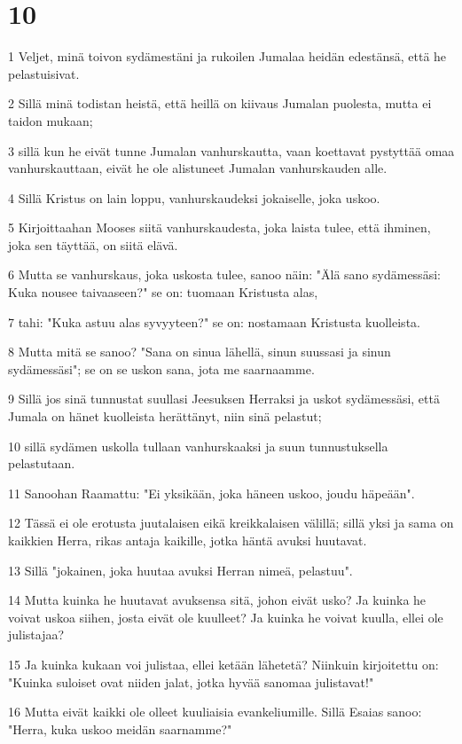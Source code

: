 \chapter{10}

\par 1 Veljet, minä toivon sydämestäni ja rukoilen Jumalaa heidän edestänsä, että he pelastuisivat.
\par 2 Sillä minä todistan heistä, että heillä on kiivaus Jumalan puolesta, mutta ei taidon mukaan;
\par 3 sillä kun he eivät tunne Jumalan vanhurskautta, vaan koettavat pystyttää omaa vanhurskauttaan, eivät he ole alistuneet Jumalan vanhurskauden alle.
\par 4 Sillä Kristus on lain loppu, vanhurskaudeksi jokaiselle, joka uskoo.
\par 5 Kirjoittaahan Mooses siitä vanhurskaudesta, joka laista tulee, että ihminen, joka sen täyttää, on siitä elävä.
\par 6 Mutta se vanhurskaus, joka uskosta tulee, sanoo näin: "Älä sano sydämessäsi: Kuka nousee taivaaseen?" se on: tuomaan Kristusta alas,
\par 7 tahi: "Kuka astuu alas syvyyteen?" se on: nostamaan Kristusta kuolleista.
\par 8 Mutta mitä se sanoo? "Sana on sinua lähellä, sinun suussasi ja sinun sydämessäsi"; se on se uskon sana, jota me saarnaamme.
\par 9 Sillä jos sinä tunnustat suullasi Jeesuksen Herraksi ja uskot sydämessäsi, että Jumala on hänet kuolleista herättänyt, niin sinä pelastut;
\par 10 sillä sydämen uskolla tullaan vanhurskaaksi ja suun tunnustuksella pelastutaan.
\par 11 Sanoohan Raamattu: "Ei yksikään, joka häneen uskoo, joudu häpeään".
\par 12 Tässä ei ole erotusta juutalaisen eikä kreikkalaisen välillä; sillä yksi ja sama on kaikkien Herra, rikas antaja kaikille, jotka häntä avuksi huutavat.
\par 13 Sillä "jokainen, joka huutaa avuksi Herran nimeä, pelastuu".
\par 14 Mutta kuinka he huutavat avuksensa sitä, johon eivät usko? Ja kuinka he voivat uskoa siihen, josta eivät ole kuulleet? Ja kuinka he voivat kuulla, ellei ole julistajaa?
\par 15 Ja kuinka kukaan voi julistaa, ellei ketään lähetetä? Niinkuin kirjoitettu on: "Kuinka suloiset ovat niiden jalat, jotka hyvää sanomaa julistavat!"
\par 16 Mutta eivät kaikki ole olleet kuuliaisia evankeliumille. Sillä Esaias sanoo: "Herra, kuka uskoo meidän saarnamme?"
